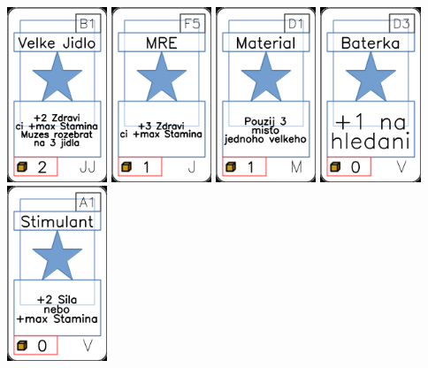 \documentclass[a4paper]{article}
\begin{document}
	\includegraphics[width=3.0cm]{img-1_35}
	\includegraphics[width=3.0cm]{img-1_29}
	\includegraphics[width=3.0cm]{img-1_45}
	\includegraphics[width=3.0cm]{img-1_77}
	\includegraphics[width=3.0cm]{img-1_60}
\end{document}
